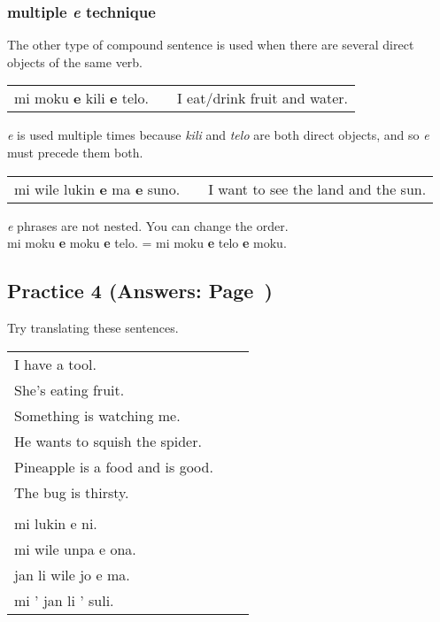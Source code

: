 \subsubsection*{multiple \textit{e} technique}
%
The other type of compound sentence is used when there are several direct objects of the same verb.

\begin{supertabular}{p{5,5cm}|ll}
mi moku \textbf{e} kili \textbf{e} telo. && I eat/drink fruit and water. \\
\end{supertabular} 

\textit{e} is used multiple times because \textit{kili} and \textit{telo} are both direct objects, and so \textit{e} must precede them both. 

\begin{supertabular}{p{5,5cm}|ll}
mi wile lukin \textbf{e} ma \textbf{e} suno. && I want to see the land and the sun. \\
\end{supertabular} 
\textit{e} phrases are not nested. You can change the order. \\
mi moku \textbf{e} moku \textbf{e} telo. = mi moku \textbf{e} telo \textbf{e} moku. 
%
\subsection*{Practice 4 (Answers: Page~\pageref{'direct_objects_compund_sentences'})}
%
Try translating these sentences.  

\begin{supertabular}{p{5,5cm}|ll}
I have a tool. &&  \\ %
She's eating fruit. &&  \\ %
Something is watching me. &&  \\ %
He wants to squish the spider. &&  \\ %
Pineapple is a food and is good. &&  \\ %
The bug is thirsty. && \\ %
  && \\ %
mi lukin e ni. &&  \\ %
mi wile unpa e ona. &&   \\ %
jan li wile jo e ma. &&  \\ %
mi ' jan li ' suli. &&  \\ %
\end{supertabular} 
